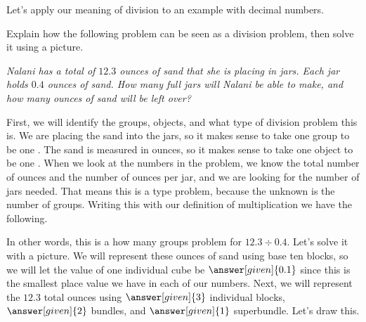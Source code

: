 \documentclass{ximera}
\begin{document}
Let's apply our meaning of division to an example with decimal numbers. 
\begin{example}
Explain how the following problem can be seen as a division problem, then solve it using a picture. 

\emph{Nalani has a total of $12.3$ ounces of sand that she is placing in jars. Each jar holds $0.4$ ounces of sand. How many full jars will Nalani be able to make, and how many ounces of sand will be left over?}

First, we will identify the groups, objects, and what type of division problem this is. We are placing the sand into the jars, so it makes sense to take one group to be one . The sand is measured in ounces, so it makes sense to take one object to be one  . When we look at the numbers in the problem, we know the total number of ounces and the number of ounces per jar, and we are looking for the number of jars needed. That means this is a  type problem, because the unknown is the number of groups. Writing this with our definition of multiplication we have the following. 
\begin{image}
\end{image}
In other words, this is a how many groups problem for $12.3 \div 0.4$. Let's solve it with a picture. We will represent these ounces of sand using base ten blocks, so we will let the value of one individual cube be $\answer[given]{0.1}$ since this is the smallest place value we have in each of our numbers. Next, we will represent the $12.3$ total ounces using $\answer[given]{3}$ individual blocks, $\answer[given]{2}$ bundles, and $\answer[given]{1}$ superbundle. Let's draw this.
\begin{image}
\begin{tikzpicture}

\end{tikzpicture}
\end{image}
\end{example}
\end{document}
